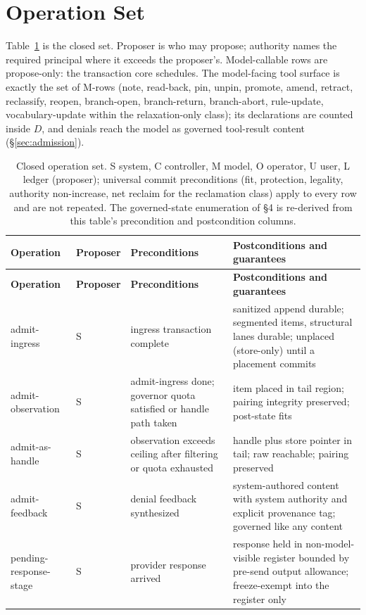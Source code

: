 \documentclass[11pt]{article}
\begin{document}
\section{Operation Set}
\label{sec:ops}

Table~\ref{tab:ops} is the closed set. Proposer is who may propose; authority names the required principal where it exceeds the proposer's. Model-callable rows are propose-only: the transaction core schedules. The model-facing tool surface is exactly the set of M-rows (note, read-back, pin, unpin, promote, amend, retract, reclassify, reopen, branch-open, branch-return, branch-abort, rule-update, vocabulary-update within the relaxation-only class); its declarations are counted inside $D$, and denials reach the model as governed tool-result content (\S\ref{sec:admission}).

{\footnotesize
\begin{longtable}{@{}p{2.35cm}p{1.15cm}p{4.6cm}p{5.6cm}@{}}
\caption{Closed operation set. S system, C controller, M model, O operator, U user, L ledger (proposer); universal commit preconditions (fit, protection, legality, authority non-increase, net reclaim for the reclamation class) apply to every row and are not repeated. The governed-state enumeration of \S4 is re-derived from this table's precondition and postcondition columns.}\label{tab:ops}\\
\toprule
\textbf{Operation} & \textbf{Proposer} & \textbf{Preconditions} & \textbf{Postconditions and guarantees} \\
\midrule
\endfirsthead
\toprule
\textbf{Operation} & \textbf{Proposer} & \textbf{Preconditions} & \textbf{Postconditions and guarantees} \\
\midrule
\endhead
admit-ingress & S & ingress transaction complete & sanitized append durable; segmented items, structural lanes durable; unplaced (store-only) until a placement commits \\
admit-observation & S & admit-ingress done; governor quota satisfied or handle path taken & item placed in tail region; pairing integrity preserved; post-state fits \\
admit-as-handle & S & observation exceeds ceiling after filtering or quota exhausted & handle plus store pointer in tail; raw reachable; pairing preserved \\
admit-feedback & S & denial feedback synthesized & system-authored content with system authority and explicit provenance tag; governed like any content \\
pending-response-stage & S & provider response arrived & response held in non-model-visible register bounded by pre-send output allowance; freeze-exempt into the register only \\

\end{longtable}}
\end{document}

